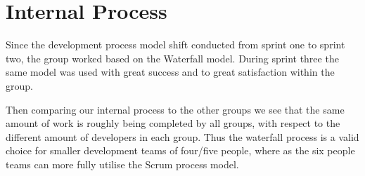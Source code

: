  \section{Internal Process}
Since the development process model shift conducted from sprint one to sprint two, the group worked based on the Waterfall model. 
During sprint three the same model was used with great success and to great satisfaction within the group. 

Then comparing our internal process to the other groups we see that the same amount of work is roughly being completed by all groups, with respect to the different amount of developers in each group. 
Thus the waterfall process is a valid choice for smaller development teams of four/five people, where as the six people teams can more fully utilise the Scrum process model. 
